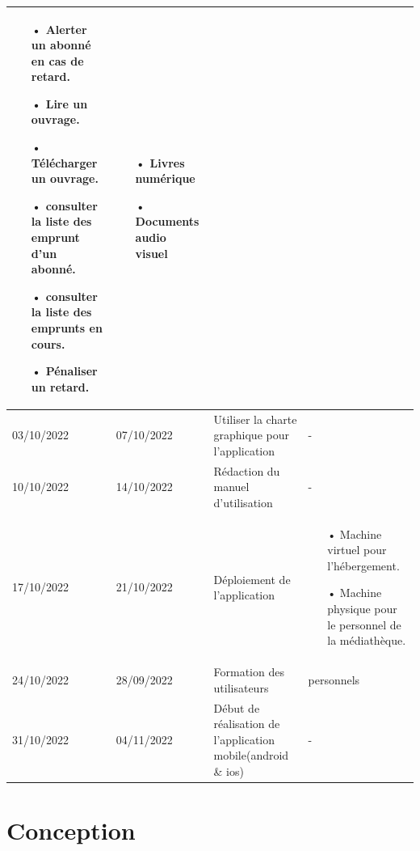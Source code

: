\documentclass[12pt,a4paper]{article}
\begin{document}
\begin{center}
\begin{tabular}{|p{2.2cm}|p{2.2cm}|p{6.5cm}|p{6.5cm}|}
\begin{itemize}
\item[•] Alerter un abonné en cas de retard.
\item[•] Lire un ouvrage.
\item[•] Télécharger un ouvrage.
\item[•] consulter la liste des emprunt d'un abonné.
\item[•] consulter la liste des emprunts en cours.
\item[•] Pénaliser un retard.
\end{itemize} & 
\begin{itemize}
\item[•] Livres numérique
\item[•] Documents audio visuel
\end{itemize} \\
\hline 
03/10/2022 & 07/10/2022 & Utiliser la charte graphique pour l'application & - \\
\hline 
10/10/2022 & 14/10/2022 & Rédaction du manuel d'utilisation & - \\ 
\hline 
17/10/2022 & 21/10/2022 & Déploiement de l'application & 
\begin{itemize}
\item[•] Machine virtuel pour l'hébergement.
\item[•] Machine physique pour le personnel de la médiathèque.
\end{itemize} \\ 
\hline
24/10/2022 & 28/09/2022 & Formation des utilisateurs & personnels\\ 
\hline  
31/10/2022 & 04/11/2022 & Début de réalisation de l'application mobile(android \& ios) & -\\ 
\hline 
\end{tabular} 
\end{center}

\section{Conception}
\end{document}
